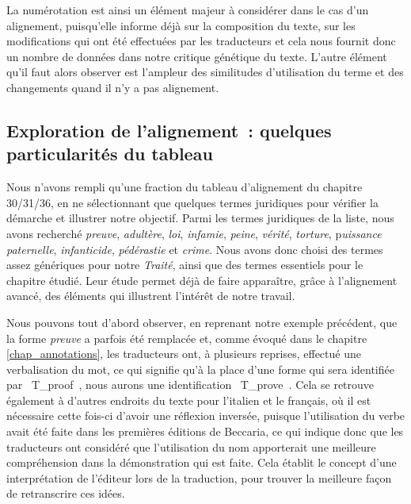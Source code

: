 La numérotation est ainsi un élément majeur à considérer dans le cas d’un alignement, puisqu’elle informe déjà sur la composition du texte, sur les modifications qui ont été effectuées par les traducteurs et cela nous fournit donc un nombre de données dans notre critique génétique du texte. L’autre élément qu’il faut alors observer est l’ampleur des similitudes d’utilisation du terme et des changements quand il n’y a pas alignement.

\subsection{Exploration de l’alignement~: quelques particularités du tableau}
Nous n’avons rempli qu’une fraction du tableau d’alignement du chapitre 30/31/36, en ne sélectionnant que quelques termes juridiques pour vérifier la démarche et illustrer notre objectif. Parmi les termes juridiques de la liste, nous avons recherché \textit{preuve}, \textit{adultère}, \textit{loi}, \textit{infamie}, \textit{peine}, \textit{vérité}, \textit{torture}, p\textit{uissance paternelle}, \textit{infanticide}, \textit{pédérastie} et \textit{crime}. Nous avons donc choisi des termes assez génériques pour notre \emph{Traité}, ainsi que des termes essentiels pour le chapitre étudié. Leur étude permet déjà de faire apparaître, grâce à l’alignement avancé, des éléments qui illustrent l’intérêt de notre travail. 

Nous pouvons tout d’abord observer, en reprenant notre exemple précédent, que la forme \textit{preuve} a parfois été remplacée et, comme évoqué dans le chapitre \ref{chap_annotations}, les traducteurs ont, à plusieurs reprises, effectué une verbalisation du mot, ce qui signifie qu’à la place d’une forme qui sera identifiée par \og~T\_proof~\fg{}, nous aurons une identification \og~T\_prove~\fg{}. Cela se retrouve également à d’autres endroits du texte pour l’italien et le français, où il est nécessaire cette fois-ci d’avoir une réflexion inversée, puisque l’utilisation du verbe avait été faite dans les premières éditions de Beccaria, ce qui indique donc que les traducteurs ont considéré que l’utilisation du nom apporterait une meilleure compréhension dans la démonstration qui est faite. Cela établit le concept d’une interprétation de l’éditeur lors de la traduction, pour trouver la meilleure façon de retranscrire ces idées.

